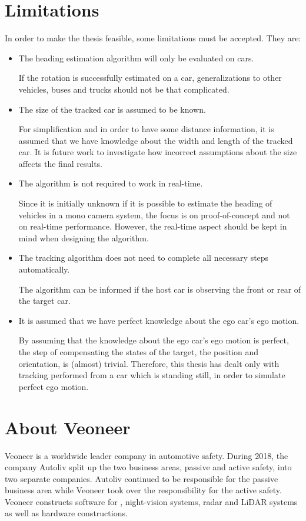 \section{Limitations}
In order to make the thesis feasible, some limitations must be accepted. They are:

\begin{itemize}	
	\item The heading estimation algorithm will only be evaluated on cars.

	If the rotation is successfully estimated on a car, generalizations to other vehicles, \eg buses and trucks should not be that complicated.

	\item The size of the tracked car is assumed to be known.

	For simplification and in order to have some  distance information, it is assumed that we have knowledge about the width and length of the tracked car.
	It is future work to investigate how incorrect assumptions about the size affects the final results.

	\item The algorithm is not required to work in real-time.

	Since it is initially unknown if it is possible to estimate the heading of vehicles in a mono camera system, the focus is on proof-of-concept and not on real-time performance.
	However, the real-time aspect should be kept in mind when designing the algorithm.

    \item The tracking algorithm does not need to complete all necessary steps automatically.

    The algorithm can \eg be informed if the host car is observing the front or rear of the target car.

	\item It is assumed that we have perfect knowledge about the ego car's ego motion.

	By assuming that the knowledge about the ego car's ego motion is perfect, the step of compensating the states of the target, \ie the position and orientation, is (almost) trivial.
	Therefore, this thesis has dealt only with tracking performed from a car which is standing still, in order to simulate perfect ego motion.
\end{itemize}

\newpage

\section{About Veoneer}
Veoneer is a worldwide leader company in automotive safety.
During 2018, the company Autoliv split up the two business areas, passive and active safety, into two separate companies.
Autoliv continued to be responsible for the passive business area while Veoneer took over the responsibility for the active safety.
Veoneer constructs software for \abbrADAS, night-vision systems, radar and LiDAR systems as well as hardware constructions.
\cite{Veoneer:2018}

